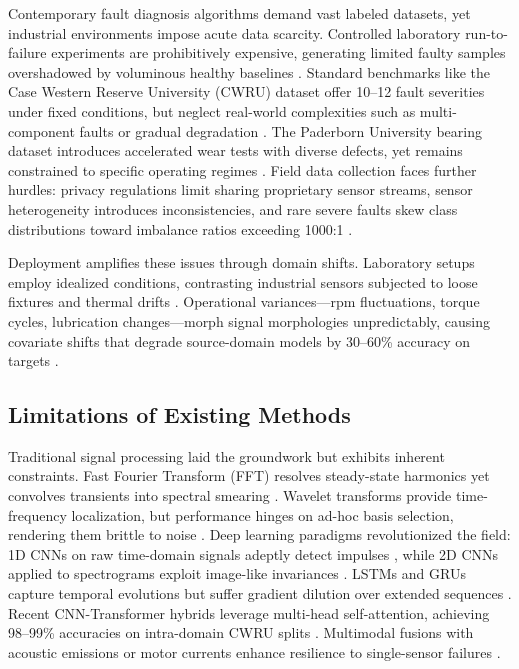 Contemporary fault diagnosis algorithms demand vast labeled datasets, yet industrial environments impose acute data scarcity. Controlled laboratory run-to-failure experiments are prohibitively expensive, generating limited faulty samples overshadowed by voluminous healthy baselines \cite{cite5}. Standard benchmarks like the Case Western Reserve University (CWRU) dataset offer 10--12 fault severities under fixed conditions, but neglect real-world complexities such as multi-component faults or gradual degradation \cite{cite6}. The Paderborn University bearing dataset introduces accelerated wear tests with diverse defects, yet remains constrained to specific operating regimes \cite{cite7}. Field data collection faces further hurdles: privacy regulations limit sharing proprietary sensor streams, sensor heterogeneity introduces inconsistencies, and rare severe faults skew class distributions toward imbalance ratios exceeding 1000:1 \cite{cite8}.

Deployment amplifies these issues through domain shifts. Laboratory setups employ idealized conditions, contrasting industrial sensors subjected to loose fixtures and thermal drifts \cite{cite25}. Operational variances—rpm fluctuations, torque cycles, lubrication changes—morph signal morphologies unpredictably, causing covariate shifts that degrade source-domain models by 30--60\% accuracy on targets \cite{cite9}\cite{cite26}.

\subsection{Limitations of Existing Methods}

Traditional signal processing laid the groundwork but exhibits inherent constraints. Fast Fourier Transform (FFT) resolves steady-state harmonics yet convolves transients into spectral smearing \cite{cite10}. Wavelet transforms provide time-frequency localization, but performance hinges on ad-hoc basis selection, rendering them brittle to noise \cite{cite11}. Deep learning paradigms revolutionized the field: 1D CNNs on raw time-domain signals adeptly detect impulses \cite{cite12}, while 2D CNNs applied to spectrograms exploit image-like invariances \cite{cite13}. LSTMs and GRUs capture temporal evolutions but suffer gradient dilution over extended sequences \cite{cite14}. Recent CNN-Transformer hybrids leverage multi-head self-attention, achieving 98--99\% accuracies on intra-domain CWRU splits \cite{cite15}. Multimodal fusions with acoustic emissions or motor currents enhance resilience to single-sensor failures \cite{cite16}.

